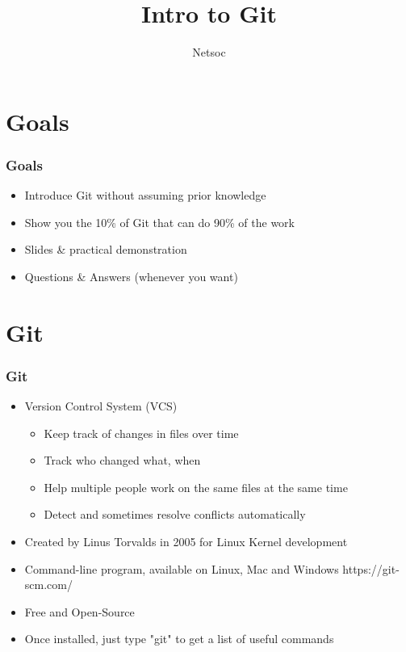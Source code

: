 \documentclass{beamer}
\title{Intro to Git}
\author{Netsoc}
\date{}
\begin{document}
\frame{\titlepage}

\section{Goals}
\begin{frame}
\frametitle{Goals}
\begin{itemize}
\item Introduce Git without assuming prior knowledge
\item Show you the 10\% of Git that can do 90\% of the work
\item Slides \& practical demonstration
\item Questions \& Answers (whenever you want)
\end{itemize}
\end{frame}

\section{Git}
\begin{frame}
\frametitle{Git}
\begin{itemize}
\item Version Control System (VCS)
\begin{itemize}
\item Keep track of changes in files over time
\item Track who changed what, when
\item Help multiple people work on the same files at the same time
\item Detect and sometimes resolve conflicts automatically
\end{itemize}
\item Created by Linus Torvalds in 2005 for Linux Kernel development
\item Command-line program, available on Linux, Mac and Windows https://git-scm.com/
\item Free and Open-Source
\item Once installed, just type "git" to get a list of useful commands
\end{itemize}
\end{frame}
\end{document}
